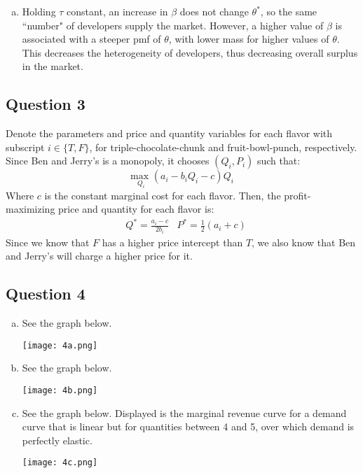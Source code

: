 \documentclass{article}
\newcommand{\usmax}[1]{\underset{#1}{\text{max }}}
\begin{document}
\begin{enumerate}[(a)]
	\item Holding $\tau$ constant, an increase in $\beta$ does not change $\theta^*$, so the same ``number" of developers supply the market. However, a higher value of $\beta$ is associated with a steeper pmf of $\theta$, with lower mass for higher values of $\theta$. This decreases the heterogeneity of developers, thus decreasing overall surplus in the market.
	
\end{enumerate}


\subsection*{Question 3}

Denote the parameters and price and quantity variables for each flavor with subscript $i\in\{T,F\}$, for triple-chocolate-chunk and fruit-bowl-punch, respectively. Since Ben and Jerry's is a monopoly, it chooses $(Q_i,P_i)$ such that:
\[
	\usmax{Q_i}(a_i-b_iQ_i - c)Q_i
\]
Where $c$ is the constant marginal cost for each flavor. Then, the profit-maximizing price and quantity for each flavor is:
\begin{align*}
	&Q^* = \frac{a_i-c}{2b_i} 	&P^* = \frac{1}{2}(a_i + c)
\end{align*}
Since we know that $F$ has a higher price intercept than $T$, we also know that Ben and Jerry's will charge a higher price for it.



\subsection*{Question 4}

\begin{enumerate}[(a)]
	\item See the graph below.
		\begin{center}
			\texttt{[image: 4a.png]}
		\end{center}
	
	\item See the graph below.
		\begin{center}
			\texttt{[image: 4b.png]}
		\end{center}
	
	\item See the graph below. Displayed is the marginal revenue curve for a demand curve that is linear but for quantities between 4 and 5, over which demand is perfectly elastic.
		\begin{center}
			\texttt{[image: 4c.png]}
		\end{center}
	
\end{enumerate}
\end{document}

